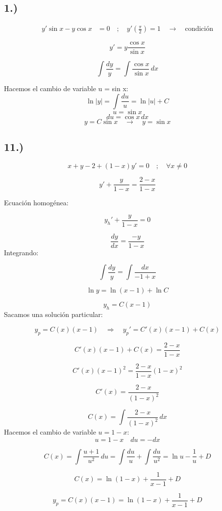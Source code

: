 \documentclass[a4paper,12pt]{article}
\begin{document}
\subsection*{1.)}
\[
\begin{aligned}
y' \sin x - y \cos x &= 0 
\quad ;\quad 
y'\!\left( \frac{\pi}{2} \right) = 1 \quad \rightarrow \quad \text{condición}
\end{aligned}
\]

\[
y' = y \frac{\cos x}{\sin x}
\]

\[
\int \frac{dy}{y} = \int \frac{\cos x}{\sin x}\, dx
\]

\medskip
\noindent
Hacemos el cambio de variable u = sin x:
\[
\ln |y| = \int \frac{du}{u} = \ln |u| + C
\]
\[
u = \sin x
\]
\[
du = \cos x\, dx
\]
\[
y = C \sin x \quad \rightarrow \quad y = \sin x
\]

\subsection*{11.)}
\[
x + y - 2 + (1 - x) y' = 0 \quad ; \quad \forall x \neq 0
\]

\[
y' + \frac{y}{1 - x} = \frac{2 - x}{1 - x}
\]

Ecuación homogénea:

\[
y_h' + \frac{y}{1 - x} = 0
\]

\[
\frac{dy}{dx} = \frac{-y}{1 - x}
\]
\newpage
\noindent
Integrando:

\[
\int \frac{dy}{y} = \int \frac{dx}{-1 + x}
\]

\[
\ln y = \ln(x - 1) + \ln C
\]

\[
y_h = C (x - 1)
\]
Sacamos una solución particular:

\[
y_p = C(x)(x - 1) \quad \Rightarrow \quad y_p' = C'(x)(x - 1) + C(x)
\]

\[
C'(x)(x - 1) + C(x) = \frac{2 - x}{1 - x}
\]

\[
C'(x)(x - 1)^2 = \frac{2 - x}{1 - x} (1 - x)^2
\]

\[
C'(x) = \frac{2 - x}{(1 - x)^2}
\]

\[
C(x) = \int \frac{2 - x}{(1 - x)^2}\, dx
\]
Hacemos el cambio de variable \(u = 1 - x\):
\[
u = 1 - x \quad du = -dx
\]

\[
C(x) = \int \frac{u + 1}{u^2}\, du = \int \frac{du}{u} + \int \frac{du}{u^2} = \ln u - \frac{1}{u} + D
\]

\[
C(x) = \ln(1 - x) + \frac{1}{x - 1} + D
\]

\[
y_p = C(x)(x - 1) = \ln(1 - x) + \frac{1}{x - 1} + D
\]
\newpage
\noindent
\end{document}
